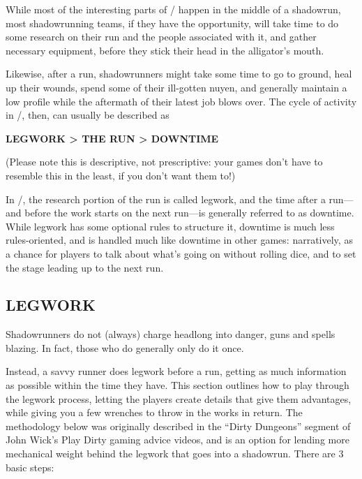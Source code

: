 \documentclass[oneside,10pt]{article}
\begin{document}
\begin{multicols}{2}
  While most of the interesting parts of \SW/ happen in the middle of
  a shadowrun, most shadowrunning teams, if they have the opportunity,
  will take time to do some research on their run and the people
  associated with it, and gather necessary equipment, before they
  stick their head in the alligator’s mouth.

  Likewise, after a run, shadowrunners might take some time to go to
  ground, heal up their wounds, spend some of their ill-gotten nuyen,
  and generally maintain a low profile while the aftermath of their
  latest job blows over. The cycle of activity in \SW/, then, can
  usually be described as

  \begin{adjustwidth*}{1cm}{2cm} {
      \orbitronfont \textbf{LEGWORK > THE RUN > DOWNTIME}}
  \end{adjustwidth*}

  (Please note this is descriptive, not prescriptive: your games don’t
  have to resemble this in the least, if you don’t want them to!)

  In \SW/, the research portion of the run is called legwork, and the
  time after a run—and before the work starts on the next run—is
  generally referred to as downtime. While legwork has some optional
  rules to structure it, downtime is much less rules-oriented, and is
  handled much like downtime in other games: narratively, as a chance
  for players to talk about what’s going on without rolling dice, and
  to set the stage leading up to the next run.

  \subsection{LEGWORK}
  Shadowrunners do not (always) charge headlong into danger, guns and
  spells blazing. In fact, those who do generally only do it once.

  Instead, a savvy runner does legwork before a run, getting as much
  information as possible within the time they have. This section
  outlines how to play through the legwork process, letting the
  players create details that give them advantages, while giving you a
  few wrenches to throw in the works in return. The methodology below
  was originally described in the ``Dirty Dungeons'' segment of John
  Wick’s Play Dirty gaming advice videos, and is an option for lending
  more mechanical weight behind the legwork that goes into a
  shadowrun. There are 3 basic steps:


\end{multicols}
\end{document}
